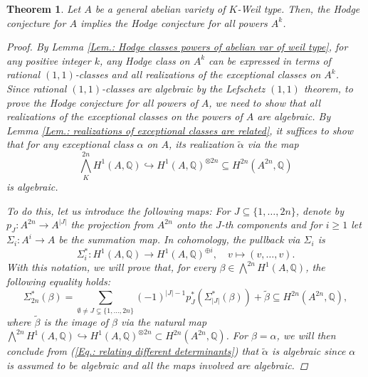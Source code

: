 \documentclass[11pt,twoside,a4paper]{amsart}
\newcommand{\0}{\mathscr{O}}
\newcommand{\Q}{\mathbb{Q}}
\theoremstyle{plain}
\newtheorem{thm}{Theorem}[section]
\theoremstyle{definition}
\theoremstyle{remark}
\begin{document}
\begin{thm}\cite{abdulali1999abelianIII}
\label{Thm.: H.c. for powers of general ab var of weil type}
Let $A$ be a general abelian variety of $K$-Weil type. Then, the Hodge conjecture for $A$ implies the Hodge conjecture for all powers $A^k$.
\begin{proof}
By Lemma \ref{Lem.: Hodge classes powers of abelian var of weil type}, for any positive integer $k$, any Hodge class on $A^k$ can be expressed in terms of rational $(1,1)$-classes and all realizations of the exceptional classes on $A^k$. Since rational $(1,1)$-classes are algebraic by the Lefschetz $(1,1)$ theorem, to prove the Hodge conjecture for all powers of $A$, we need to show that all realizations of the exceptional classes on the powers of $A$ are algebraic. By Lemma \ref{Lem.: realizations of exceptional classes are related}, it suffices to show that for any exceptional class $\alpha$ on $A$, its realization $\widetilde{\alpha}$ via the map 
\[
\textstyle\bigwedge_K^{2n} H^1(A,\Q)\hookrightarrow H^1(A,\Q)^{\otimes 2n}\subseteq H^{2n}(A^{2n},\Q)
\]
is algebraic.

\smallskip

To do this, let us introduce the following maps: For $J\subseteq\{1,\ldots,2n\}$, denote by $p_J\colon A^{2n}\rightarrow A^{|J|}$ the projection from $A^{2n}$ onto the $J$-th components and for $i\geq 1$ let $\Sigma_i\colon A^i\rightarrow A$ be the summation map. In cohomology, the pullback via $\Sigma_i$ is
\[
\Sigma_i^*\colon H^1(A,\Q)\rightarrow H^1(A,\Q)^{\oplus i}, \quad v\mapsto (v,\ldots,v).
\]
With this notation, we will prove that, for every $\beta\in \bigwedge^{2n}H^1(A,\Q)$, the following equality holds:
\begin{equation}
\label{Eq.: relating different determinants}
   \Sigma_{2n}^*(\beta)=\sum_{\emptyset\not =J\subsetneq\{1,\ldots,2n\}} (-1)^{|J|-1}p_J^*(\Sigma_{|J|}^*(\beta))+\widetilde{\beta}\subseteq\textstyle H^{2n}(A^{2n},\Q),
\end{equation}
where $\widetilde{\beta}$ is the image of $\beta$ via the natural map $\bigwedge^{2n}H^1(A,\Q)\hookrightarrow H^1(A,\Q)^{\otimes 2n}\subset H^{2n}(A^{2n},\Q)$.
For $\beta=\alpha$, we will then conclude from (\ref{Eq.: relating different determinants}) that $\widetilde{\alpha}$ is algebraic since $\alpha$ is assumed to be algebraic and all the maps involved are algebraic.


\end{proof}
\end{thm}
\end{document}
